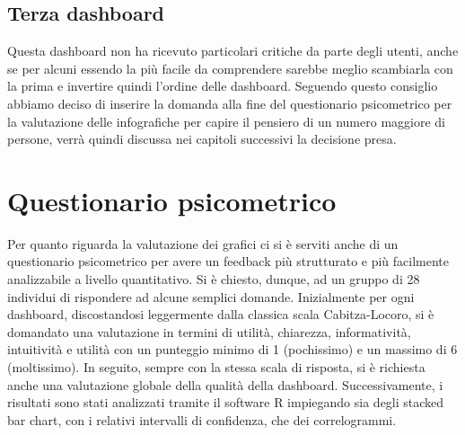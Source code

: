 \documentclass[12pt]{article}
\begin{document}
\subsection{Terza dashboard}
Questa dashboard non ha ricevuto particolari critiche da parte degli utenti, anche se per alcuni essendo la più facile da comprendere sarebbe meglio scambiarla con la prima e invertire quindi l'ordine delle dashboard. Seguendo questo consiglio abbiamo deciso di inserire la domanda alla fine del questionario psicometrico per la valutazione delle infografiche per capire il pensiero di un numero maggiore di persone, verrà quindi discussa nei capitoli successivi la decisione presa.

\newpage
\section{Questionario psicometrico}
Per quanto riguarda la valutazione dei grafici ci si è serviti anche di un questionario psicometrico per avere un feedback più strutturato e più facilmente analizzabile a livello quantitativo. Si è chiesto, dunque, ad un gruppo di 28 individui di rispondere ad alcune semplici domande. Inizialmente per ogni dashboard, discostandosi leggermente dalla classica scala Cabitza-Locoro, si è domandato una valutazione in termini di utilità, chiarezza, informatività, intuitività e utilità con un punteggio minimo di 1 (pochissimo) e un massimo di 6 (moltissimo). In seguito, sempre con la stessa scala di risposta, si è richiesta anche una valutazione globale della qualità della dashboard.
Successivamente, i risultati sono stati analizzati tramite il software R impiegando sia degli stacked bar chart, con i relativi intervalli di confidenza, che dei correlogrammi.
\end{document}
